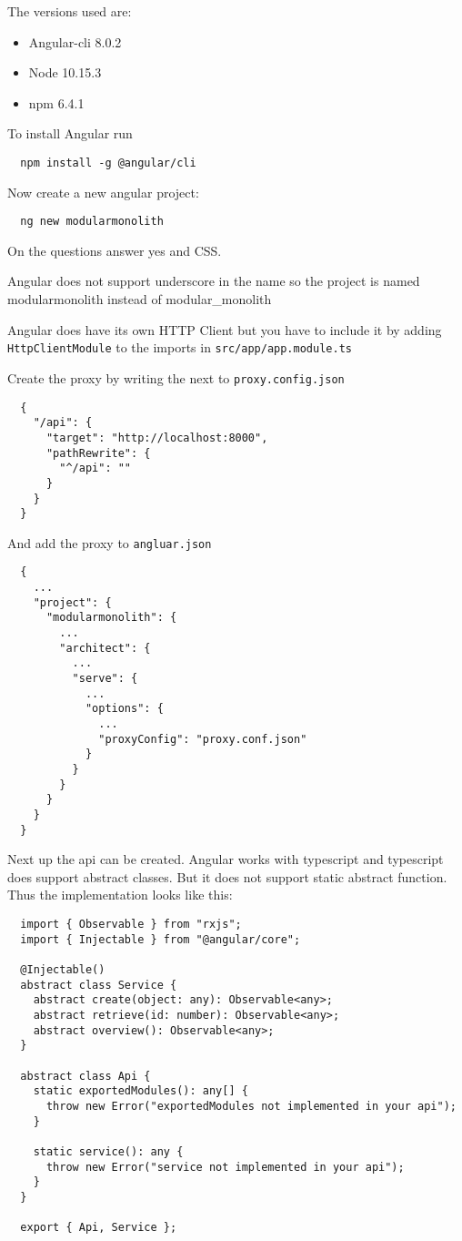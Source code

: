 The versions used are:
\begin{itemize}
  \item Angular-cli 8.0.2
  \item Node 10.15.3
  \item npm 6.4.1
\end{itemize}

To install Angular run
\begin{verbatim}
  npm install -g @angular/cli
\end{verbatim}

Now create a new angular project:
\begin{verbatim}
  ng new modularmonolith
\end{verbatim}

On the questions answer yes and CSS.

Angular does not support underscore in the name so the project is named modularmonolith instead of modular\_monolith

Angular does have its own HTTP Client but you have to include it by adding \texttt{HttpClientModule} to the imports in \texttt{src/app/app.module.ts}

Create the proxy by writing the next to \texttt{proxy.config.json}
\begin{verbatim}
  {
    "/api": {
      "target": "http://localhost:8000",
      "pathRewrite": {
        "^/api": ""
      }
    }
  }
\end{verbatim}

And add the proxy to \texttt{angluar.json}
\begin{verbatim}
  {
    ...
    "project": {
      "modularmonolith": {
        ...
        "architect": {
          ...
          "serve": {
            ...
            "options": {
              ...
              "proxyConfig": "proxy.conf.json"
            }
          }
        }
      }
    }
  }
\end{verbatim}

Next up the api can be created. Angular works with typescript and typescript does support abstract classes. But it does not support static abstract function. Thus the implementation looks like this:
\begin{verbatim}
  import { Observable } from "rxjs";
  import { Injectable } from "@angular/core";

  @Injectable()
  abstract class Service {
    abstract create(object: any): Observable<any>;
    abstract retrieve(id: number): Observable<any>;
    abstract overview(): Observable<any>;
  }

  abstract class Api {
    static exportedModules(): any[] {
      throw new Error("exportedModules not implemented in your api");
    }

    static service(): any {
      throw new Error("service not implemented in your api");
    }
  }

  export { Api, Service };
\end{verbatim}

